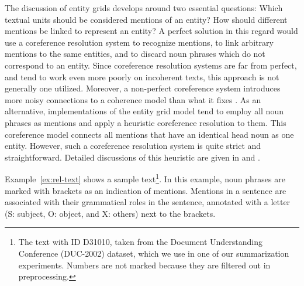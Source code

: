 The discussion of entity grids develops around two essential questions: Which textual units should be considered mentions of an entity? How should different mentions be linked to represent an entity? 
A perfect solution in this regard would use a coreference resolution system to recognize mentions, to link arbitrary mentions to the same entities, and to discard noun phrases which do not correspond to an entity. 
Since coreference resolution systems are far from perfect, and tend to work even more poorly on incoherent texts, this approach is not generally one utilized.  
Moreover, a non-perfect coreference system introduces more noisy connections to a coherence model than what it fixes \cite{barzilay08}.  
As an alternative, implementations of the entity grid model tend to employ all noun phrases as mentions and apply a heuristic coreference resolution to them.  
This coreference model connects all mentions that have an identical head noun as one entity. 
However, such a coreference resolution system is quite strict and straightforward. 
Detailed discussions of this heuristic are given in  and . 

Example~\ref{ex:rel-text} shows a sample text\footnote{The text with ID D31010, taken from the Document Understanding Conference (DUC-2002) dataset, which we use in one of our summarization experiments. Numbers are not marked because they are filtered out in preprocessing.}.  
In this example, noun phrases are marked with brackets as an indication of mentions. 
Mentions in a sentence are associated with their grammatical roles in the sentence, annotated with a letter (S: subject, O: object, and X: others) next to the brackets. 

